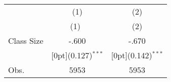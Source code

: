 \begin{tabular*}{\textwidth}{@{\extracolsep{\fill}}lcc}		
	& \multicolumn{1}{c}{(1)} &	\multicolumn{1}{c}{(2)} \\
\cline{2-3}		
	& \multicolumn{1}{c}{(1)\mbox{\ }} &	\multicolumn{1}{c}{(2)} \\
\hline		
Class Size &	-.600 &	-.670 \\
&	\raisebox{.7ex}[0pt]{\scriptsize (0.127)$^{***}$} &	\raisebox{.7ex}[0pt]{\scriptsize (0.142)$^{***}$} \\
Obs. &	5953 &	5953 \\
\hline\hline		
\end{tabular*}%
